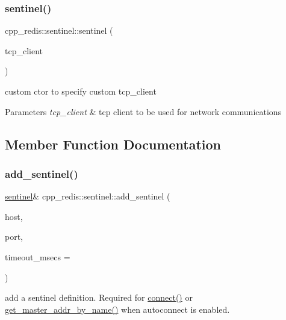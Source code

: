 \subsubsection{\texorpdfstring{sentinel()}{sentinel()}\hspace{0.1cm}{\footnotesize\ttfamily [2/2]}}
{\footnotesize\ttfamily cpp\+\_\+redis\+::sentinel\+::sentinel (\begin{DoxyParamCaption}\item[{const std\+::shared\+\_\+ptr$<$ \mbox{\hyperlink{classcpp__redis_1_1network_1_1tcp__client__iface}{network\+::tcp\+\_\+client\+\_\+iface}} $>$ \&}]{tcp\+\_\+client }\end{DoxyParamCaption})\hspace{0.3cm}{\ttfamily [explicit]}}

custom ctor to specify custom tcp\+\_\+client


\begin{DoxyParams}{Parameters}
{\em tcp\+\_\+client} & tcp client to be used for network communications \\
\hline
\end{DoxyParams}


\subsection{Member Function Documentation}
\mbox{\label{classcpp__redis_1_1sentinel_a6c846b71478c330d2cad7aa662dfd681}} 
\subsubsection{\texorpdfstring{add\+\_\+sentinel()}{add\_sentinel()}}
{\footnotesize\ttfamily \mbox{\hyperlink{classcpp__redis_1_1sentinel}{sentinel}}\& cpp\+\_\+redis\+::sentinel\+::add\+\_\+sentinel (\begin{DoxyParamCaption}\item[{const std\+::string \&}]{host,  }\item[{std\+::size\+\_\+t}]{port,  }\item[{std\+::uint32\+\_\+t}]{timeout\+\_\+msecs = {} }\end{DoxyParamCaption})}

add a sentinel definition. Required for \mbox{\hyperlink{classcpp__redis_1_1sentinel_a1dfba8240daf7cfa7502f57957cffbda}{connect()}} or \mbox{\hyperlink{classcpp__redis_1_1sentinel_a2886493b40b00dfafdd3b22dfe28e0c3}{get\+\_\+master\+\_\+addr\+\_\+by\+\_\+name()}} when autoconnect is enabled.


